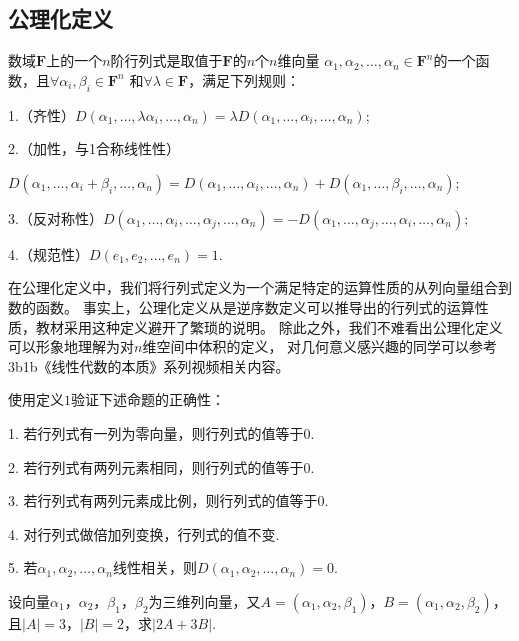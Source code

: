 \subsection{公理化定义}
\begin{definition}
	数域$\mathbf{F}$上的一个$n$阶行列式是取值于$\mathbf{F}$的$n$个$n$维向量
	$\alpha_1,\alpha_2,\dots,\alpha_n \in \mathbf{F}^n$的一个函数，且$\forall \alpha_i,\beta_i \in \mathbf{F}^n$
	和$\forall \lambda \in \mathbf{F}$，满足下列规则：
	
	\textup{1}.（齐性）$D(\alpha_1,\dots,\lambda\alpha_i,\dots,\alpha_n)=\lambda D(\alpha_1,\dots,\alpha_i,\dots,\alpha_n)$\textup{;}

	\textup{2}.（加性，与\textup{1}合称线性性）
	
	$D(\alpha_1,\dots,\alpha_i+\beta_i,\dots,\alpha_n)=D(\alpha_1,\dots,\alpha_i,\dots,\alpha_n)+D(\alpha_1,\dots,\beta_i,\dots,\alpha_n)$\textup{;}

	\textup{3}.（反对称性）$D(\alpha_1,\dots,\alpha_i,\dots,\alpha_j,\dots,\alpha_n)=-D(\alpha_1,\dots,\alpha_j,\dots,\alpha_i,\dots,\alpha_n)$\textup{;}

	\textup{4}.（规范性）$D(e_1,e_2,\dots,e_n)=1$.
\end{definition}
在公理化定义中，我们将行列式定义为一个满足特定的运算性质的从列向量组合到数的函数。
事实上，公理化定义从是逆序数定义可以推导出的行列式的运算性质，教材采用这种定义避开了繁琐的说明。
除此之外，我们不难看出公理化定义可以形象地理解为对$n$维空间中体积的定义，
对几何意义感兴趣的同学可以参考3b1b《线性代数的本质》系列视频相关内容。
\begin{example}
	使用定义$1$验证下述命题的正确性：

	\textup{1}. 若行列式有一列为零向量，则行列式的值等于$0$.

	\textup{2}. 若行列式有两列元素相同，则行列式的值等于$0$.

	\textup{3}. 若行列式有两列元素成比例，则行列式的值等于$0$.

	\textup{4}. 对行列式做倍加列变换，行列式的值不变.

	\textup{5}. 若$\alpha_1,\alpha_2,\dots,\alpha_n$线性相关，则$D(\alpha_1,\alpha_2,\dots,\alpha_n)=0$.
\end{example}

\begin{example}
	设向量$\alpha_1$，$\alpha_2$，$\beta_1$，$\beta_2$为三维列向量，又$A=(\alpha_1,\alpha_2,\beta_1)$，$B=(\alpha_1,\alpha_2,\beta_2)$，
	且$|A|=3$，$|B|=2$，求$|2A+3B|$.
\end{example}

